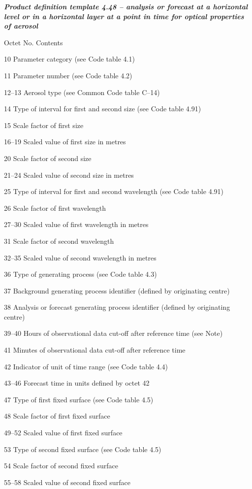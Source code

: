 \emph{\textbf{Product definition template 4.48 -- analysis or forecast at a horizontal level or in a horizontal layer at a point in time for optical properties of aerosol}}

Octet No. Contents

10 Parameter category (see Code table 4.1)

11 Parameter number (see Code table 4.2)

12--13 Aerosol type (see Common Code table C--14)

14 Type of interval for first and second size (see Code table 4.91)

15 Scale factor of first size

16--19 Scaled value of first size in metres

20 Scale factor of second size

21--24 Scaled value of second size in metres

25 Type of interval for first and second wavelength (see Code table 4.91)

26 Scale factor of first wavelength

27--30 Scaled value of first wavelength in metres

31 Scale factor of second wavelength

32--35 Scaled value of second wavelength in metres

36 Type of generating process (see Code table 4.3)

37 Background generating process identifier (defined by originating centre)

38 Analysis or forecast generating process identifier (defined by originating centre)

39--40 Hours of observational data cut-off after reference time (see Note)

41 Minutes of observational data cut-off after reference time

42 Indicator of unit of time range (see Code table 4.4)

43--46 Forecast time in units defined by octet 42

47 Type of first fixed surface (see Code table 4.5)

48 Scale factor of first fixed surface

49--52 Scaled value of first fixed surface

53 Type of second fixed surface (see Code table 4.5)

54 Scale factor of second fixed surface

55--58 Scaled value of second fixed surface

